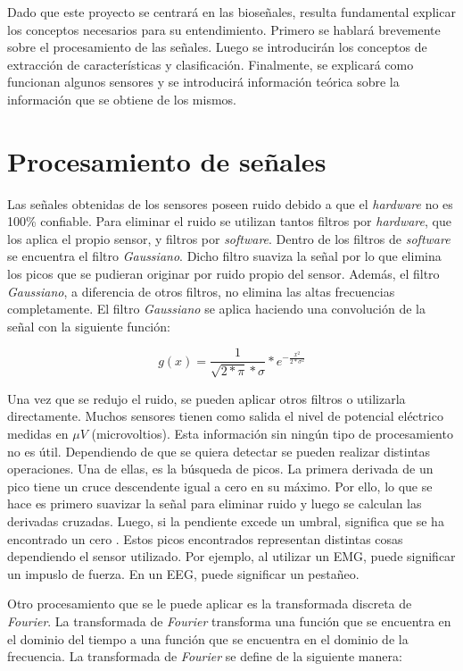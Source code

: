 Dado que este proyecto se centrará en las bioseñales, resulta fundamental explicar los conceptos necesarios para su entendimiento. Primero se hablará brevemente sobre el procesamiento de las señales. Luego se introducirán los conceptos de extracción de características y clasificación. Finalmente, se explicará como funcionan algunos sensores y se introducirá información teórica sobre la información que se obtiene de los mismos.

\section{Procesamiento de señales}

Las señales obtenidas de los sensores poseen ruido debido a que el \emph{hardware} no es 100\% confiable. Para eliminar el ruido se utilizan tantos filtros por \emph{hardware}, que los aplica el propio sensor, y filtros por \emph{software}. Dentro de los filtros de \emph{software} se encuentra el filtro \emph{Gaussiano}. Dicho filtro suaviza la señal por lo que elimina los picos que se pudieran originar por ruido propio del sensor. Además, el filtro \emph{Gaussiano}, a diferencia de otros filtros, no elimina las altas frecuencias completamente. El filtro \emph{Gaussiano} se aplica haciendo una convolución de la señal con la siguiente función:

$$ g(x) = \frac{1}{\sqrt{2 * \pi} * \sigma } * e^{-\frac{x^{2}}{2 * \sigma^{2}}} $$

Una vez que se redujo el ruido, se pueden aplicar otros filtros o utilizarla directamente. Muchos sensores tienen como salida el nivel de potencial eléctrico medidas en $\mu V$ (microvoltios). Esta información sin ningún tipo de procesamiento no es útil. Dependiendo de que se quiera detectar se pueden realizar distintas operaciones. Una de ellas, es la búsqueda de picos. La primera derivada de un pico tiene un cruce descendente igual a cero en su máximo. Por ello, lo que se hace es primero suavizar la señal para eliminar ruido y luego se calculan las derivadas cruzadas. Luego, si la pendiente excede un umbral, significa que se ha encontrado un cero \cite{peak-finding}. Estos picos encontrados representan distintas cosas dependiendo el sensor utilizado. Por ejemplo, al utilizar un EMG, puede significar un impuslo de fuerza. En un EEG, puede significar un pestañeo.

Otro procesamiento que se le puede aplicar es la transformada discreta de \emph{Fourier}. La transformada de \emph{Fourier} transforma una función que se encuentra en el dominio del tiempo a una función que se encuentra en el dominio de la frecuencia. La transformada de \emph{Fourier} se define de la siguiente manera:

